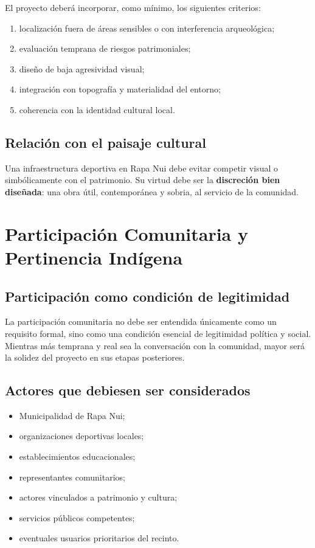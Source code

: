 \documentclass[12pt,letterpaper]{article}
\begin{document}
El proyecto deberá incorporar, como mínimo, los siguientes criterios:

\begin{enumerate}
    \item localización fuera de áreas sensibles o con interferencia arqueológica;
    \item evaluación temprana de riesgos patrimoniales;
    \item diseño de baja agresividad visual;
    \item integración con topografía y materialidad del entorno;
    \item coherencia con la identidad cultural local.
\end{enumerate}

\subsection{Relación con el paisaje cultural}

Una infraestructura deportiva en Rapa Nui debe evitar competir visual o simbólicamente con el patrimonio. Su virtud debe ser la \textbf{discreción bien diseñada}: una obra útil, contemporánea y sobria, al servicio de la comunidad.

\section{Participación Comunitaria y Pertinencia Indígena}

\subsection{Participación como condición de legitimidad}

La participación comunitaria no debe ser entendida únicamente como un requisito formal, sino como una condición esencial de legitimidad política y social. Mientras más temprana y real sea la conversación con la comunidad, mayor será la solidez del proyecto en sus etapas posteriores.

\subsection{Actores que debiesen ser considerados}

\begin{itemize}
    \item Municipalidad de Rapa Nui;
    \item organizaciones deportivas locales;
    \item establecimientos educacionales;
    \item representantes comunitarios;
    \item actores vinculados a patrimonio y cultura;
    \item servicios públicos competentes;
    \item eventuales usuarios prioritarios del recinto.
\end{itemize}
\end{document}
